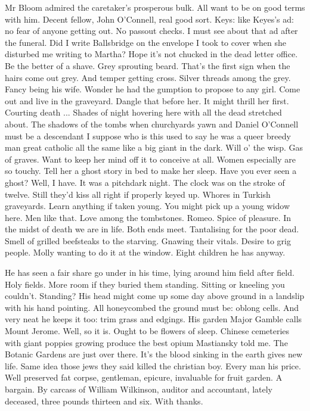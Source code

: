 Mr Bloom admired the caretaker's prosperous bulk.
All want to be on good terms with him.
Decent fellow, John O'Connell, real good sort.
Keys:
like Keyes's ad:
no fear of anyone getting out.
No passout checks.
I must see about that ad after the funeral.
Did I write Ballsbridge on the envelope I took to cover
when she disturbed me writing to Martha?
Hope it's not chucked in the dead letter office.
Be the better of a shave.
Grey sprouting beard.
That's the first sign when the hairs come out grey.
And temper getting cross.
Silver threads among the grey.
Fancy being his wife.
Wonder he had the gumption to propose to any girl.
Come out and live in the graveyard.
Dangle that before her.
It might thrill her first.
Courting death ...
Shades of night hovering here with all the dead stretched about.
The shadows of the tombs when churchyards yawn
and Daniel O'Connell must be a descendant I suppose
who is this used to say
he was a queer breedy man
great catholic all the same
like a big giant in the dark.
Will o' the wisp.
Gas of graves.
Want to keep her mind off it to conceive at all.
Women especially are so touchy.
Tell her a ghost story in bed to make her sleep.
Have you ever seen a ghost?
Well, I have.
It was a pitchdark night.
The clock was on the stroke of twelve.
Still they'd kiss all right if properly keyed up.
Whores in Turkish graveyards.
Learn anything if taken young.
You might pick up a young widow here.
Men like that.
Love among the tombstones.
Romeo.
Spice of pleasure.
In the midst of death we are in life.
Both ends meet.
Tantalising for the poor dead.
Smell of grilled beefsteaks to the starving.
Gnawing their vitals.
Desire to grig people.
Molly wanting to do it at the window.
Eight children he has anyway.

He has seen a fair share go under in his time,
lying around him field after field.
Holy fields.
More room if they buried them standing.
Sitting or kneeling you couldn't.
Standing?
His head might come up some day above ground in a landslip with his hand pointing.
All honeycombed the ground must be:
oblong cells.
And very neat he keeps it too:
trim grass and edgings.
His garden Major Gamble calls Mount Jerome.
Well, so it is.
Ought to be flowers of sleep.
Chinese cemeteries with giant poppies growing produce the best opium
Mastiansky told me.
The Botanic Gardens are just over there.
It's the blood sinking in the earth gives new life.
Same idea those jews they said killed the christian boy.
Every man his price.
Well preserved fat corpse, gentleman, epicure,
invaluable for fruit garden.
A bargain.
By carcass of William Wilkinson, auditor and accountant, lately deceased,
three pounds thirteen and six.
With thanks.

